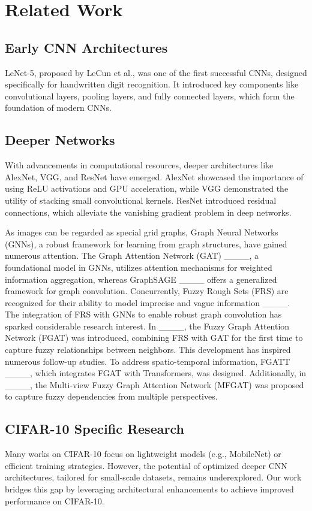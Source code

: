 \section{Related Work}
\subsection{Early CNN Architectures}
LeNet-5, proposed by LeCun et al., was one of the first successful CNNs, designed specifically for handwritten digit recognition. It introduced key components like convolutional layers, pooling layers, and fully connected layers, which form the foundation of modern CNNs.
\subsection{Deeper Networks}
With advancements in computational resources, deeper architectures like AlexNet, VGG, and ResNet have emerged. AlexNet showcased the importance of using ReLU activations and GPU acceleration, while VGG demonstrated the utility of stacking small convolutional kernels. ResNet introduced residual connections, which alleviate the vanishing gradient problem in deep networks.

As images can be regarded as special grid graphs, Graph Neural Networks (GNNs), a robust framework for learning from graph structures, have gained numerous attention. The Graph Attention Network (GAT) ____, a foundational model in GNNs, utilizes attention mechanisms for weighted information aggregation, whereas GraphSAGE ____ offers a generalized framework for graph convolution. Concurrently, Fuzzy Rough Sets (FRS) are recognized for their ability to model imprecise and vague information ____. The integration of FRS with GNNs to enable robust graph convolution has sparked considerable research interest. In ____, the Fuzzy Graph Attention Network (FGAT) was introduced, combining FRS with GAT for the first time to capture fuzzy relationships between neighbors. This development has inspired numerous follow-up studies. To address spatio-temporal information, FGATT ____, which integrates FGAT with Transformers, was designed. Additionally, in ____, the Multi-view Fuzzy Graph Attention Network (MFGAT) was proposed to capture fuzzy dependencies from multiple perspectives.
\subsection{CIFAR-10 Specific Research}
Many works on CIFAR-10 focus on lightweight models (e.g., MobileNet) or efficient training strategies. However, the potential of optimized deeper CNN architectures, tailored for small-scale datasets, remains underexplored. Our work bridges this gap by leveraging architectural enhancements to achieve improved performance on CIFAR-10.